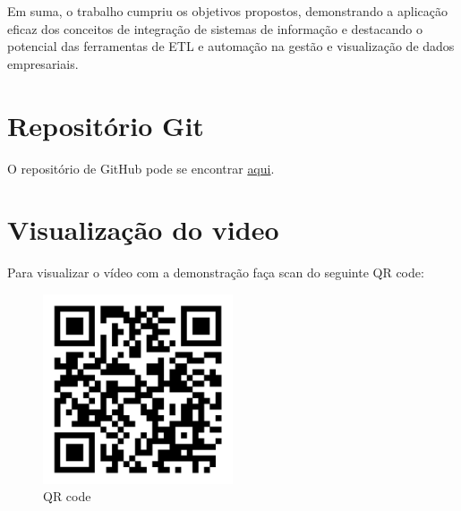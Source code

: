 \documentclass[a4paper, 12pt]{article} %
\begin{document}
Em suma, o trabalho cumpriu os objetivos propostos, demonstrando a aplicação eficaz dos conceitos de integração de sistemas de informação e destacando o potencial das ferramentas de ETL e automação na gestão e visualização de dados empresariais.

\section{Repositório Git}

O repositório de GitHub pode se encontrar \href{https://github.com/DiogoMachado04/ISI}{aqui}.

\section{Visualização do video}

Para visualizar o vídeo com a demonstração faça scan do seguinte QR code:

\begin{figure}[h] 
	\centering 
	\includegraphics[width=0.5\textwidth]{images/qr_code.png}
	\caption{QR code}
	\label{fig:qr_code}
\end{figure}

\end{document}
